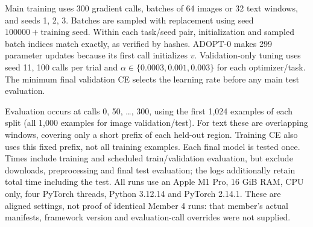 Main training uses 300 gradient calls, batches of 64 images or 32 text windows, and seeds
1, 2, 3. Batches are sampled with replacement using seed $100000+\text{training seed}$.
Within each task/seed pair, initialization and sampled batch indices match exactly, as
verified by hashes. ADOPT-0 makes 299 parameter updates because its first call initializes
$v$. Validation-only tuning uses seed 11, 100 calls per trial and
$\alpha\in\{0.0003,0.001,0.003\}$ for each optimizer/task. The minimum final validation CE
selects the learning rate before any main test evaluation.

Evaluation occurs at calls 0, 50, \ldots, 300, using the first 1,024 examples of each split
(all 1,000 examples for image validation/test). For text these are overlapping windows,
covering only a short prefix of each held-out region. Training CE also uses this fixed prefix,
not all training examples. Each final model is tested once. Times include training and scheduled
train/validation evaluation, but exclude downloads, preprocessing and final test evaluation;
the logs additionally retain total time including the test. All runs use an Apple M1 Pro,
16 GiB RAM, CPU only, four PyTorch threads, Python 3.12.14 and PyTorch 2.14.1.
These are aligned settings, not proof of identical Member 4 runs: that member's actual
manifests, framework version and evaluation-call overrides were not supplied.
